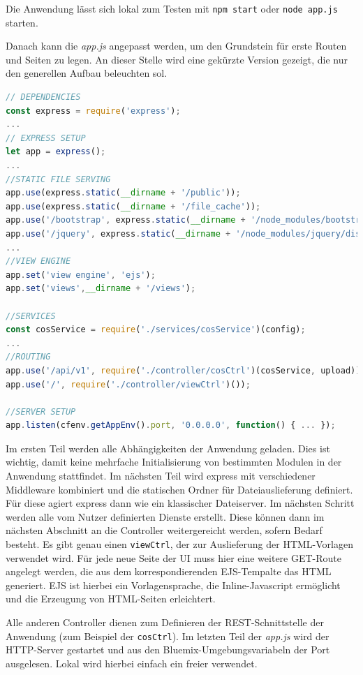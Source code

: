 Die Anwendung lässt sich lokal zum Testen mit \lstinline|npm start| oder \lstinline|node app.js| starten.
 
Danach kann die \textit{app.js} angepasst werden, um den Grundstein für erste Routen und Seiten zu legen. An dieser Stelle wird eine gekürzte Version gezeigt, die nur den generellen Aufbau beleuchten sol.

\begin{lstlisting}[language=JavaScript, caption=Anpassung der Hauptdatei der Anwendung]
// DEPENDENCIES
const express = require('express');
... 
// EXPRESS SETUP
let app = express();
...
//STATIC FILE SERVING
app.use(express.static(__dirname + '/public'));
app.use(express.static(__dirname + '/file_cache'));
app.use('/bootstrap', express.static(__dirname + '/node_modules/bootstrap/dist'));
app.use('/jquery', express.static(__dirname + '/node_modules/jquery/dist'));
...
//VIEW ENGINE
app.set('view engine', 'ejs');
app.set('views',__dirname + '/views');

//SERVICES
const cosService = require('./services/cosService')(config);
...
//ROUTING
app.use('/api/v1', require('./controller/cosCtrl')(cosService, upload));
app.use('/', require('./controller/viewCtrl')());

//SERVER SETUP
app.listen(cfenv.getAppEnv().port, '0.0.0.0', function() { ... });
\end{lstlisting}

Im ersten Teil werden alle Abhängigkeiten der Anwendung geladen. Dies ist wichtig, damit keine mehrfache Initialisierung von bestimmten Modulen in der Anwendung stattfindet. Im nächsten Teil wird express mit verschiedener Middleware kombiniert und die statischen Ordner für Dateiauslieferung definiert. Für diese agiert express dann wie ein klassischer Dateiserver.
Im nächsten Schritt werden alle vom Nutzer definierten Dienste erstellt. Diese können dann im nächsten Abschnitt an die Controller weitergereicht werden, sofern Bedarf besteht.
Es gibt genau einen \lstinline|viewCtrl|, der zur Auslieferung der HTML-Vorlagen verwendet wird. Für jede neue Seite der \ac{UI} muss hier eine weitere GET-Route angelegt werden, die aus dem korrespondierenden EJS-Tempalte das HTML generiert.
EJS ist hierbei ein Vorlagensprache, die Inline-Javascript ermöglicht und die Erzeugung von HTML-Seiten erleichtert.

Alle anderen Controller dienen zum Definieren der REST-Schnittstelle der Anwendung (zum Beispiel der \lstinline|cosCtrl|). Im letzten Teil der \textit{app.js} wird der HTTP-Server gestartet und aus den Bluemix-Umgebungsvariabeln der Port ausgelesen. Lokal wird hierbei einfach ein freier verwendet.\\

